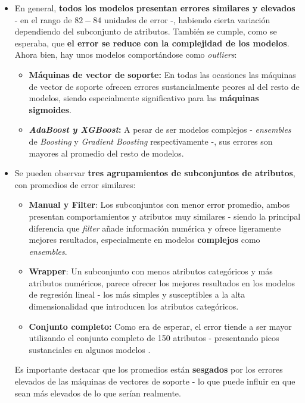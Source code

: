 \begin{itemize}[leftmargin=*, parsep=1pt, itemsep=0pt, topsep=1pt]
	\item En general, \textbf{todos los modelos presentan errores similares y elevados} - en el rango de $82-84$ unidades de error -, habiendo cierta variación dependiendo del subconjunto de atributos. También se cumple, como se esperaba, que \textbf{el error se reduce con la complejidad de los modelos}. Ahora bien, hay unos modelos comportándose como \textit{outliers}:
	\begin{itemize}[parsep=1pt, itemsep=0pt, topsep=1pt]
		\item \textbf{Máquinas de vector de soporte:} En todas las ocasiones las máquinas de vector de soporte ofrecen errores sustancialmente peores al del resto de modelos, siendo especialmente significativo para las \textbf{máquinas sigmoides}.
		\item \textbf{\textit{AdaBoost y XGBoost}:} A pesar de ser modelos complejos - \textit{ensembles} de \textit{Boosting} y \textit{Gradient Boosting} respectivamente -, sus errores son mayores al promedio del resto de modelos.
	\end{itemize}
	\item Se pueden observar \textbf{tres agrupamientos de subconjuntos de atributos}, con promedios de error similares:
	\begin{itemize}[parsep=1pt, itemsep=0pt, topsep=1pt]
		\item \textbf{Manual y Filter}: Los subconjuntos con menor error promedio, ambos presentan comportamientos y atributos muy similares - siendo la principal diferencia que \textit{filter} añade información numérica y ofrece ligeramente mejores resultados, especialmente en modelos \textbf{complejos} como \textit{ensembles}.
		
		\item \textbf{Wrapper}: Un subconjunto con menos atributos categóricos y más atributos numéricos, parece ofrecer los mejores resultados en los modelos de regresión lineal - los más simples y susceptibles a la alta dimensionalidad que introducen los atributos categóricos.
		
		\item \textbf{Conjunto completo:} Como era de esperar, el error tiende a ser mayor utilizando el conjunto completo de 150 atributos - presentando picos sustanciales en algunos modelos .
	\end{itemize}
	
	Es importante destacar que los promedios están \textbf{sesgados} por los errores elevados de las máquinas de vectores de soporte - lo que puede influir en que sean más elevados de lo que serían realmente.
\end{itemize}

